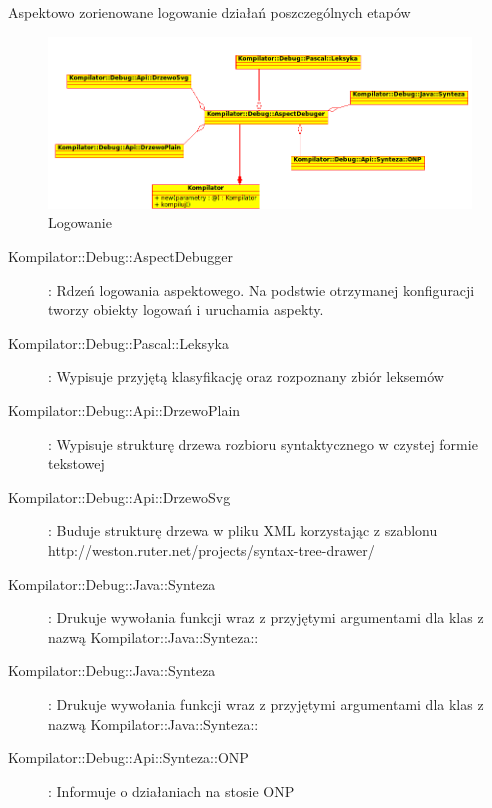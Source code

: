 \documentclass[a4paper,12pt]{article}
\begin{document}
Aspektowo zorienowane logowanie działań poszczególnych etapów
\begin{figure}[h!]
   \includegraphics[width=15cm]{grafika/model/end.png}
   \caption{Logowanie}
\end{figure}

\begin{description}
	\item[Kompilator::Debug::AspectDebugger]: Rdzeń logowania aspektowego. Na podstwie otrzymanej konfiguracji tworzy obiekty logowań i uruchamia aspekty.
	\item[Kompilator::Debug::Pascal::Leksyka]: Wypisuje przyjętą klasyfikację oraz rozpoznany zbiór leksemów
	\item[Kompilator::Debug::Api::DrzewoPlain]: Wypisuje strukturę drzewa rozbioru syntaktycznego w czystej formie tekstowej
	\item[Kompilator::Debug::Api::DrzewoSvg]: Buduje strukturę drzewa w pliku XML korzystając z szablonu http://weston.ruter.net/projects/syntax-tree-drawer/
	\item[Kompilator::Debug::Java::Synteza]: Drukuje wywołania funkcji wraz z przyjętymi argumentami dla klas z nazwą Kompilator::Java::Synteza::
	\item[Kompilator::Debug::Java::Synteza]: Drukuje wywołania funkcji wraz z przyjętymi argumentami dla klas z nazwą Kompilator::Java::Synteza::
	\item[Kompilator::Debug::Api::Synteza::ONP]: Informuje o działaniach na stosie ONP
\end{description}

\newpage
\end{document}
